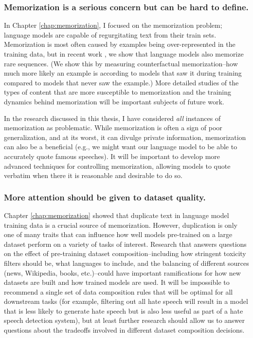 \subsubsection{Memorization is a serious concern but can be hard to define.}
	In Chapter \ref{chap:memorization}, I focused on the memorization problem; language models are capable of regurgitating text from their train sets.
	Memorization is most often caused by examples being over-represented in the training data, but in recent work \citep{zhang2021counterfactual}, we show that language models also memorize rare sequences.
	(We show this by measuring counterfactual memorization--how much more likely an example is according to models that saw it during training compared to models that never saw the example.)
	More detailed studies of the types of content that are more susceptible to memorization and the training dynamics behind memorization will be important subjects of future work.

	In the research discussed in this thesis, I have considered \textit{all} instances of memorization as problematic.
	While memorization is often a sign of poor generalization, and at its worst, it can divulge private information, memorization can also be a beneficial (e.g., we might want our language model to be able to accurately quote famous speeches).
	It will be important to develop more advanced techniques for controlling memorization, allowing models to quote verbatim when there it is reasonable and desirable to do so.

\subsubsection{More attention should be given to dataset quality.}
	Chapter \ref{chap:memorization} showed that duplicate text in language model training data is a crucial source of memorization.
	However, duplication is only one of many traits that can influence how well models pre-trained on a large dataset perform on a variety of tasks of interest.
	Research that answers questions on the effect of pre-training dataset composition--including how stringent toxicity filters should be, what languages to include, and the balancing of different sources (news, Wikipedia, books, etc.)--could have important ramifications for how new datasets are built and how trained models are used.
	It will be impossible to recommend a single set of data composition rules that will be optimal for all downstream tasks (for example, filtering out all hate speech will result in a model that is less likely to generate hate speech but is also less useful as part of a hate speech detection system), but at least further research should allow us to answer questions about the tradeoffs involved in different dataset composition decisions. 
	
